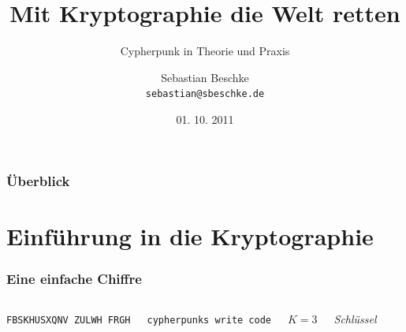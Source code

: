 \documentclass{beamer}
\title{Mit Kryptographie die Welt retten}
\subtitle{Cypherpunk in Theorie und Praxis}
\author{Sebastian Beschke \\ \texttt{sebastian@sbeschke.de}}
\institute{Chaostreff Tübingen}
\date{01. 10. 2011}
\begin{document}
\AtBeginSection[]
{
	\begin{frame}
		\begin{center}
		\Large{\insertsection}
		\end{center}
	\end{frame}
}

\begin{frame}
\titlepage
\end{frame}


\begin{frame}
	\frametitle{Überblick}
	\tableofcontents
\end{frame}

\section{Einführung in die Kryptographie}

\begin{frame}
\frametitle{Eine einfache Chiffre}
\begin{columns}

	\texttt{FBSKHUSXQNV ZULWH FRGH}

\pause	\texttt{cypherpunks write code}

\pause	\(K=3\)

	\textit{Schlüssel}

\end{columns}
\end{frame}
\end{document}
